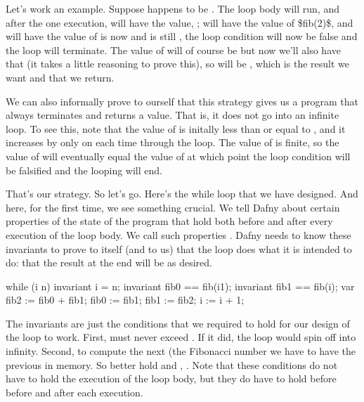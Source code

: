 \documentclass[letterpaper,10pt,english]{sphinxmanual}
\begin{document}
Let’s work an example. Suppose  happens to be . The loop body
will run, and after the one execution,  will have the value, ;
 will have the value of \$fib(2)\$, and  will have the value
of  is now  and  is still , the loop
condition will now be false and the loop will terminate. The value of
 will of course be  but now we’ll also have that  (it takes a little reasoning to prove this), so  will be
, which is the result we want and that we return.

We can also informally prove to ourself that this strategy gives us
a program that always terminates and returns a value. That is, it does
not go into an infinite loop. To see this, note that the value of 
is initally less than or equal to , and it increases by only  on
each time through the loop. The value of  is finite, so the value
of  will eventually equal the value of  at which point the loop
condition will be falsified and the looping will end.

That’s our strategy. So let’s go. Here’s the while loop that we have
designed. And here, for the first time, we see something crucial. We
tell Dafny about certain properties of the state of the program that
hold both before and after every execution of the loop body. We call
such properties . Dafny needs to know these invariants to
prove to itself (and to us) that the loop does what it is intended to
do: that the result at the end will be as desired.

\begin{sphinxVerbatim}[commandchars=\\\{\}]
while (i \PYGZlt{} n)
    invariant i \PYGZlt{}= n;
    invariant fib0 == fib(i\PYGZhy{}1);
    invariant fib1 == fib(i);
\PYGZob{}
    var fib2 := fib0 + fib1;
    fib0 := fib1;
    fib1 := fib2;
    i := i + 1;
\PYGZcb{}
\end{sphinxVerbatim}

The invariants are just the conditions that we required to hold for
our design of the loop to work. First,  must never exceed . If
it did, the loop would spin off into infinity. Second, to compute the
next (the  Fibonacci number we have to have the previous 
in memory. So  better hold  and , . Note
that these conditions do not have to hold  the execution of
the loop body, but they do have to hold before before and after each
execution.
\end{document}
